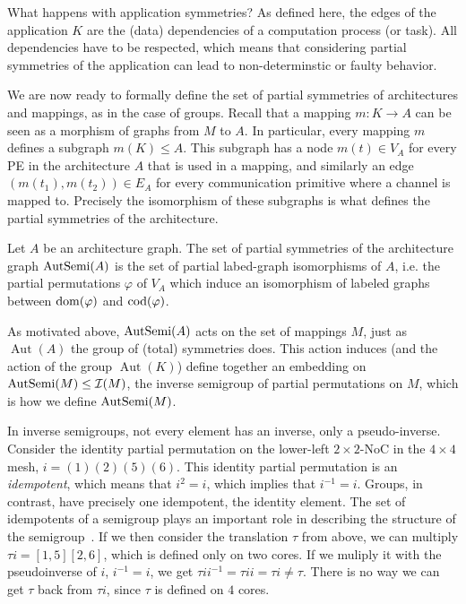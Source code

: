 What happens with application symmetries? As defined here, the edges of the application $K$ are the (data) dependencies of a computation process (or task).
All dependencies have to be respected, which means that considering partial symmetries of the application can lead to non-determinstic or faulty behavior. 

We are now ready to formally define the set of partial symmetries of architectures and mappings, as in the case of groups.
Recall that a mapping $m: K \rightarrow A$ can be seen as a morphism of graphs from $M$ to $A$.
In particular, every mapping $m$ defines a subgraph $m(K) \leq A$.
This subgraph has a node $m(t) \in V_A$ for every \ac{PE} in the architecture $A$ that is used in a mapping, and similarly an edge $(m(t_1),m(t_2)) \in E_A$ for every communication primitive where a channel is mapped to.
Precisely the isomorphism of these subgraphs is what defines the partial symmetries of the architecture. 

\begin{defn}[$\AutSemi$]
   Let $A$ be an architecture graph.
   The set of partial symmetries of the architecture graph $\operatorname{AutSemi}(A)$ is the set of partial labed-graph isomorphisms of $A$, i.e. the partial permutations $\varphi$ of $V_A$ which induce an isomorphism of labeled graphs between $\operatorname{dom}(\varphi)$ and $\operatorname{cod}(\varphi)$.
\index{$\AutSemi$}
\end{defn}

As motivated above, $\operatorname{AutSemi}(A)$ acts on the set of mappings $M$, just as $\operatorname{Aut}(A)$ the group of (total) symmetries does.
This action induces (and the action of the group $\operatorname{Aut}(K)$) define together an embedding on $\operatorname{AutSemi}(M) \leq \mathcal{I}(M)$, the inverse semigroup of partial permutations on $M$, which is how we define $\operatorname{AutSemi}(M)$.

In inverse semigroups, not every element has an inverse, only a pseudo-inverse. 
Consider the identity partial permutation on the lower-left $2\times 2$-\ac{NoC} in the $4 \times 4$ mesh, $i = (1)(2)(5)(6)$.
This identity partial permutation is an \emph{idempotent}, which means that $i^2 = i$, which implies that $i^{-1} = i$.
Groups, in contrast, have precisely one idempotent, the identity element.
The set of idempotents of a semigroup plays an important role in describing the structure of the semigroup~\cite{lawson_inverse_semigroups}.
If we then consider the translation $\tau$ from above, we can multiply $\tau i = [1,5][2,6]$, which is defined only on two cores.
If we muliply it with the pseudoinverse of $i$, $i^{-1} = i$, we get $\tau i i^{-1} = \tau i i = \tau i \neq \tau$.
There is no way we can get $\tau$ back from $\tau i$, since $\tau$ is defined on $4$ cores.

